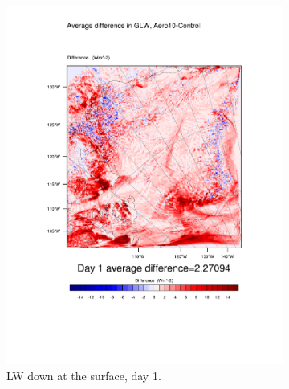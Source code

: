 \begin{figure}
	\begin{subfigure}{0.48\textwidth}
		\centering
		\includegraphics[width=\textwidth]{results/aero10/diff_Aero10_GLW_Day1.pdf}
		\caption{LW down at the surface, day 1.}
		\label{subfig:glw_r3Day1}
	\end{subfigure}
	\quad
	\begin{subfigure}{0.48\textwidth}
		\centering

\end{subfigure}
\end{figure}
